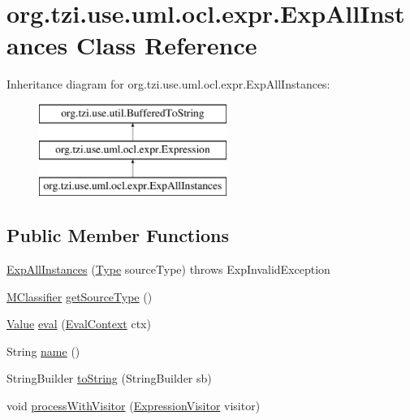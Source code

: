 \hypertarget{classorg_1_1tzi_1_1use_1_1uml_1_1ocl_1_1expr_1_1_exp_all_instances}{\section{org.\-tzi.\-use.\-uml.\-ocl.\-expr.\-Exp\-All\-Instances Class Reference}
\label{classorg_1_1tzi_1_1use_1_1uml_1_1ocl_1_1expr_1_1_exp_all_instances}
}
Inheritance diagram for org.\-tzi.\-use.\-uml.\-ocl.\-expr.\-Exp\-All\-Instances\-:\begin{figure}[H]
\begin{center}
\leavevmode
\includegraphics[height=3.000000cm]{classorg_1_1tzi_1_1use_1_1uml_1_1ocl_1_1expr_1_1_exp_all_instances}
\end{center}
\end{figure}
\subsection*{Public Member Functions}
\begin{DoxyCompactItemize}
\item 
\hyperlink{classorg_1_1tzi_1_1use_1_1uml_1_1ocl_1_1expr_1_1_exp_all_instances_ac1616478cb71a27b7bb2674536a9cf9d}{Exp\-All\-Instances} (\hyperlink{interfaceorg_1_1tzi_1_1use_1_1uml_1_1ocl_1_1type_1_1_type}{Type} source\-Type)  throws Exp\-Invalid\-Exception     
\item 
\hyperlink{interfaceorg_1_1tzi_1_1use_1_1uml_1_1mm_1_1_m_classifier}{M\-Classifier} \hyperlink{classorg_1_1tzi_1_1use_1_1uml_1_1ocl_1_1expr_1_1_exp_all_instances_ae1187a5fdae0f9b744c18928c5a52a81}{get\-Source\-Type} ()
\item 
\hyperlink{classorg_1_1tzi_1_1use_1_1uml_1_1ocl_1_1value_1_1_value}{Value} \hyperlink{classorg_1_1tzi_1_1use_1_1uml_1_1ocl_1_1expr_1_1_exp_all_instances_a6cbd9545dad38592998d2e34b5b2ec4e}{eval} (\hyperlink{classorg_1_1tzi_1_1use_1_1uml_1_1ocl_1_1expr_1_1_eval_context}{Eval\-Context} ctx)
\item 
String \hyperlink{classorg_1_1tzi_1_1use_1_1uml_1_1ocl_1_1expr_1_1_exp_all_instances_a63005da8216e3c994f196546cf598ed8}{name} ()
\item 
String\-Builder \hyperlink{classorg_1_1tzi_1_1use_1_1uml_1_1ocl_1_1expr_1_1_exp_all_instances_a1c80d6c04356d7cef1b8070916949ba4}{to\-String} (String\-Builder sb)
\item 
void \hyperlink{classorg_1_1tzi_1_1use_1_1uml_1_1ocl_1_1expr_1_1_exp_all_instances_a0bc7f2b83c9536a66d02ec39b35faf94}{process\-With\-Visitor} (\hyperlink{interfaceorg_1_1tzi_1_1use_1_1uml_1_1ocl_1_1expr_1_1_expression_visitor}{Expression\-Visitor} visitor)
\end{DoxyCompactItemize}
